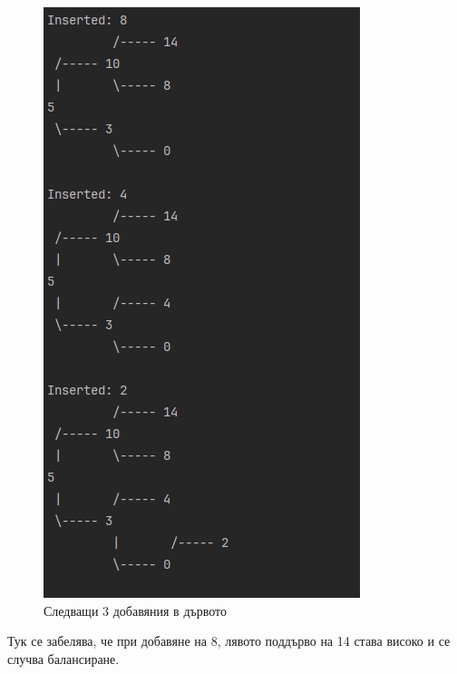 \documentclass[a4paper,fleqn,12pt]{article}
\begin{document}
\newpage
\begin{figure}[h!]
	\centering
        \includegraphics[scale=0.7]{images/result2.png}
        \caption{Следващи 3 добавяния в дървото}
\end{figure}
\noindent
Тук се забелява, че при добавяне на 8, лявото поддърво на 14 става високо и се случва балансиране. 
\newpage
\end{document}
